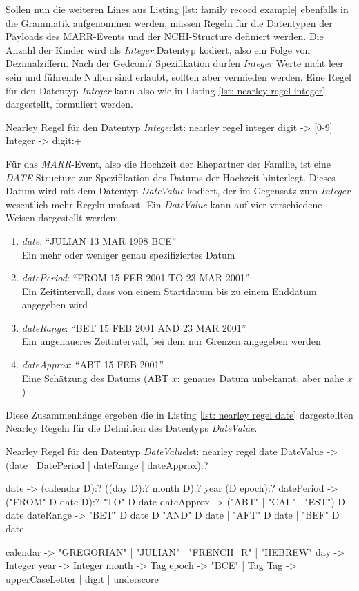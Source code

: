 Sollen nun die weiteren Lines aus Listing \ref{lst: family record example} ebenfalls in die Grammatik aufgenommen werden, müssen Regeln für die Datentypen der Payloads des MARR-Events und der NCHI-Structure definiert werden. Die Anzahl der Kinder wird als  \textit{Integer} Datentyp kodiert, also ein Folge von Dezimalziffern. Nach der Gedcom7 Spezifikation dürfen \textit{Integer} Werte nicht leer sein und führende Nullen sind erlaubt, sollten aber vermieden werden. Eine Regel für den Datentyp \textit{Integer} kann also wie in Listing \ref{lst: nearley regel integer} dargestellt, formuliert werden.
\vspace{1em}
\begin{javascript}{Nearley Regel für den Datentyp \textit{Integer}}{lst: nearley regel integer}
	digit    ->  [0-9]
	Integer  ->  digit:+
\end{javascript}
\vspace{1em}
Für das \textit{MARR}-Event, also die Hochzeit der Ehepartner der Familie, ist eine\\\textit{DATE}-Structure zur Spezifikation des Datums der Hochzeit hinterlegt. Dieses Datum wird mit dem Datentyp \textit{DateValue} kodiert, der im Gegensatz zum \textit{Integer} wesentlich mehr Regeln umfasst. Ein \textit{DateValue} kann auf vier verschiedene Weisen dargestellt werden:
\begin{enumerate}
	\item \textit{date}: ``JULIAN 13 MAR 1998 BCE''\\Ein mehr oder weniger genau spezifiziertes Datum
	\item \textit{datePeriod}: ``FROM 15 FEB 2001 TO 23 MAR 2001''\\Ein Zeitintervall, dass von einem Startdatum bis zu einem Enddatum angegeben wird
	\item \textit{dateRange}: ``BET 15 FEB 2001 AND 23 MAR 2001''\\Ein ungenaueres Zeitintervall, bei dem nur Grenzen angegeben werden
	\item \textit{dateApprox}: ``ABT 15 FEB 2001''\\Eine Schätzung des Datums (ABT $x$: genaues Datum unbekannt, aber nahe $x$)
\end{enumerate}
Diese Zusammenhänge ergeben die in Listing \ref{lst: nearley regel date} dargestellten Nearley Regeln für die Definition des Datentyps \textit{DateValue}.
\vspace{1em}
\begin{javascript}{Nearley Regel für den Datentyp \textit{DateValue}}{lst: nearley regel date}
	DateValue   ->  (date | DatePeriod | dateRange | dateApprox):?
		
	date		->  (calendar  D):?  
					((day  D):?  month  D):?  
					year  
					(D  epoch):?
	datePeriod  ->  ("FROM"  D  date  D):?  "TO"  D  date
	dateApprox  ->  ("ABT" | "CAL" | "EST")  D  date 
	dateRange   ->  "BET"  D  date  D  "AND"  D  date  
					|   "AFT"  D  date  
					|   "BEF"  D  date 
	
	calendar 	->  "GREGORIAN" | "JULIAN" | "FRENCH_R" | "HEBREW"
	day      	->  Integer  
	year 	 	->  Integer
	month    	->  Tag
	epoch    	->  "BCE" | Tag
	Tag 		->  upperCaseLetter  |  digit  |  underscore 
\end{javascript}
